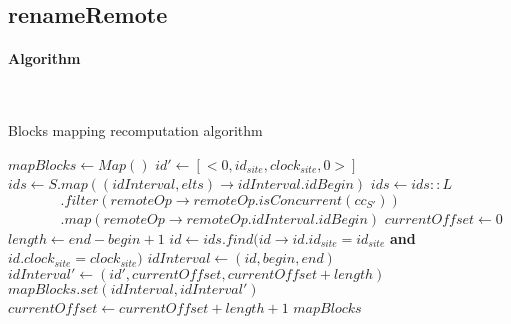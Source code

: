 \documentclass[a4paper]{article}
\begin{document}
\subsection{renameRemote}

\paragraph{Algorithm}~\\

\begin{algorithm}
  \caption{Blocks mapping recomputation algorithm}
  \label{alg:blocks-mapping-recomputation}
  \begin{algorithmic}
      \State $mapBlocks \gets Map()$
      \State $id' \gets [<0, id_{site}, clock_{site}, 0>]$
      \State $ids \gets S.map((idInterval, elts) \to idInterval.idBegin)$
      \State $ids \gets ids :: L$
      \State $~~~~~~~~~~~~~~~~~.filter(remoteOp \to remoteOp.isConcurrent(cc_{S'}))$
      \State $~~~~~~~~~~~~~~~~~.map(remoteOp \to remoteOp.idInterval.idBegin)$
      \State $currentOffset \gets 0$
        \State $length \gets end - begin + 1$
        \State $id \gets ids.find(id \to id.id_{site} = id_{site}$ \textbf{and} $id.clock_{site} = clock_{site})$
        \State $idInterval \gets (id, begin, end)$
        \State $idInterval' \gets (id', currentOffset, currentOffset + length)$
        \State $mapBlocks.set(idInterval, idInterval')$
        \State $currentOffset \gets currentOffset + length + 1$
      \EndFor
      \State \Return $mapBlocks$
    \EndFunction
  \end{algorithmic}
\end{algorithm}
\end{document}
